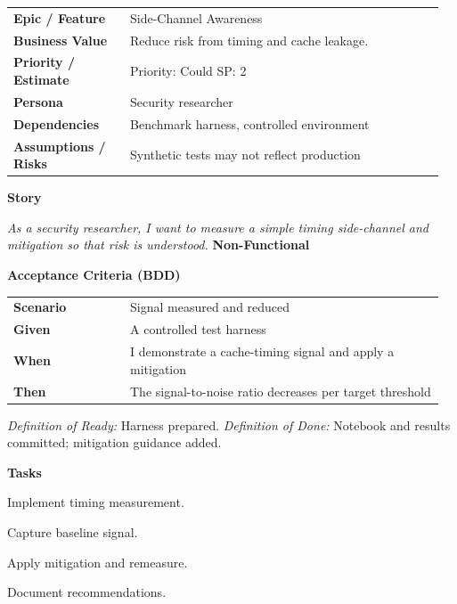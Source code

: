 \documentclass[11pt,letterpaper]{article}
\makeatletter
\newenvironment{kvtable}{%
  \begin{tabular}{@{}>{\bfseries\arraybackslash}p{0.26\linewidth} p{0.70\linewidth}@{}}
}{\end{tabular}}
\newenvironment{bdd}{%
  \begin{tabular}{@{}>{\bfseries\arraybackslash}p{0.26\linewidth} p{0.70\linewidth}@{}}
}{\end{tabular}}
\newcommand{\DoRDoD}[2]{%
  \vspace{0.35em}
  {\footnotesize\color{Muted}%
    \textit{Definition of Ready:} #1 \; \textbullet\;
    \textit{Definition of Done:} #2%
  }%
}
\newenvironment{storycard}[2]{%
  \begin{tcolorbox}[cloudcard, title={#1 --- #2}]%
}{\end{tcolorbox}}
\newcommand{\sectionlabel}[1]{\vspace{0.35em}\textbf{#1}\par}
\makeatother
\begin{document}
\begin{storycard}{CCS-32}{Ch. 32 — Side-Channel Attacks \& Defenses}
\begin{kvtable}
Epic / Feature & Side-Channel Awareness\\
Business Value & Reduce risk from timing and cache leakage.\\
Priority / Estimate & Priority: Could \quad SP: 2\\
Persona & Security researcher\\
Dependencies & Benchmark harness, controlled environment\\
Assumptions / Risks & Synthetic tests may not reflect production\\
\end{kvtable}
\sectionlabel{Story}
\textit{As a security researcher, I want to measure a simple timing side-channel and mitigation so that risk is understood.}
\sectionlabel{Non-Functional}\;
\sectionlabel{Acceptance Criteria (BDD)}
\begin{bdd}
Scenario & Signal measured and reduced\\
Given & A controlled test harness\\
When & I demonstrate a cache-timing signal and apply a mitigation\\
Then & The signal-to-noise ratio decreases per target threshold\\
\end{bdd}
\DoRDoD{Harness prepared.}{Notebook and results committed; mitigation guidance added.}
\sectionlabel{Tasks}
\begin{checklist}
\item Implement timing measurement.
\item Capture baseline signal.
\item Apply mitigation and remeasure.
\item Document recommendations.
\end{checklist}
\end{storycard}
\end{document}
